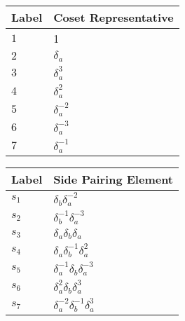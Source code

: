\documentclass{article}
\begin{document}
\begin{center}
\begin{tabular}{ll}
\toprule
Label & Coset Representative\\
\midrule
$1$ & 1 \\
$2$ & $\delta_a^{}$ \\
$3$ & $\delta_a^{3}$ \\
$4$ & $\delta_a^{2}$ \\
$5$ & $\delta_a^{-2}$ \\
$6$ & $\delta_a^{-3}$ \\
$7$ & $\delta_a^{-1}$ \\
\bottomrule
\end{tabular}
\hfill
\begin{tabular}{ll}
\toprule
Label & Side Pairing Element\\
\midrule
$s_{1}$ & $\delta_b^{}\delta_a^{-2}$ \\
$s_{2}$ & $\delta_b^{-1}\delta_a^{-3}$ \\
$s_{3}$ & $\delta_a^{}\delta_b^{}\delta_a^{}$ \\
$s_{4}$ & $\delta_a^{}\delta_b^{-1}\delta_a^{2}$ \\
$s_{5}$ & $\delta_a^{-1}\delta_b^{}\delta_a^{-3}$ \\
$s_{6}$ & $\delta_a^{2}\delta_b^{}\delta_a^{3}$ \\
$s_{7}$ & $\delta_a^{-2}\delta_b^{-1}\delta_a^{3}$ \\
\bottomrule
\end{tabular}
\end{center}

\thispagestyle{empty}
\end{document}
